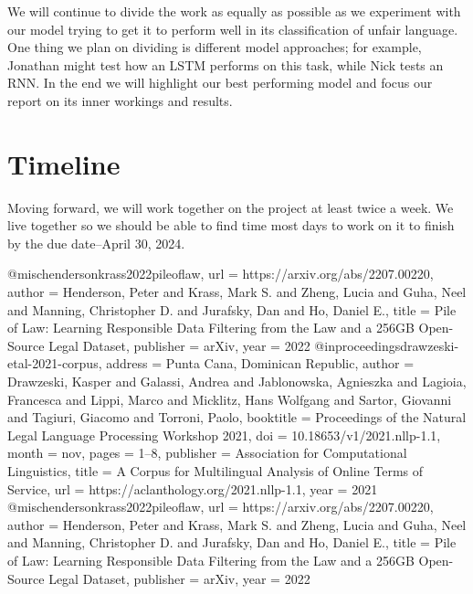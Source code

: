 \documentclass[11pt,a4paper]{article}
\begin{document}
We will continue to divide the work as equally as possible as we experiment with our model trying to get it to perform well in its classification of unfair language.
One thing we plan on dividing is different model approaches; for example, Jonathan might test how an LSTM performs on this task, while Nick tests an RNN.
In the end we will highlight our best performing model and focus our report on its inner workings and results.


\section{Timeline}

Moving forward, we will work together on the project at least twice a week. 
We live together so we should be able to find time most days to work on it to finish by the due date--April 30, 2024.



@misc{hendersonkrass2022pileoflaw,
  url = {https://arxiv.org/abs/2207.00220},
  author = {Henderson, Peter and Krass, Mark S. and Zheng, Lucia and Guha, Neel and Manning, Christopher D. and Jurafsky, Dan and Ho, Daniel E.},
  title = {Pile of Law: Learning Responsible Data Filtering from the Law and a 256GB Open-Source Legal Dataset},
  publisher = {arXiv},
  year = {2022}
}
@inproceedings{drawzeski-etal-2021-corpus,
  address = {Punta Cana, Dominican Republic},
  author = {Drawzeski, Kasper and Galassi, Andrea and Jablonowska, Agnieszka and Lagioia, Francesca and Lippi, Marco and Micklitz, Hans Wolfgang and Sartor, Giovanni and Tagiuri, Giacomo and Torroni, Paolo},
  booktitle = {Proceedings of the Natural Legal Language Processing Workshop 2021},
  doi = {10.18653/v1/2021.nllp-1.1},
  month = {nov},
  pages = {1--8},
  publisher = {Association for Computational Linguistics},
  title = {{A Corpus for Multilingual Analysis of Online Terms of Service}},
  url = {https://aclanthology.org/2021.nllp-1.1},
  year = {2021}
}
@misc{hendersonkrass2022pileoflaw,
  url = {https://arxiv.org/abs/2207.00220},
  author = {Henderson, Peter and Krass, Mark S. and Zheng, Lucia and Guha, Neel and Manning, Christopher D. and Jurafsky, Dan and Ho, Daniel E.},
  title = {Pile of Law: Learning Responsible Data Filtering from the Law and a 256GB Open-Source Legal Dataset},
  publisher = {arXiv},
  year = {2022}
}
\end{document}

